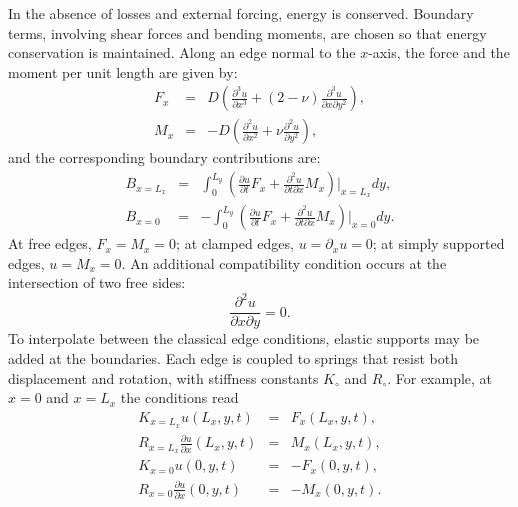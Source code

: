 %
In the absence of losses and external forcing, energy is conserved. Boundary terms, involving shear forces and bending moments, are chosen so that energy conservation is maintained. Along an edge normal to the $x$-axis, the force and the moment per unit length are given by:
\begin{subequations}
\begin{eqnarray}
F_x &=& D\!\left(\frac{\partial^3 u}{\partial x^3}+(2-\nu)\frac{\partial^3 u}{\partial x \partial y^2}\right), \\
M_x &=& -D\!\left(\frac{\partial^2 u}{\partial x^2}+\nu\frac{\partial^2 u}{\partial y^2}\right),
\end{eqnarray}
\end{subequations}
and the corresponding boundary contributions are:
\begin{subequations}
\begin{eqnarray}
B_{x=L_x} &=& \int_0^{L_y}\!\left(\frac{\partial u}{\partial t}F_x + \frac{\partial^2 u}{\partial t\partial x}M_x\right)\Big|_{x=L_x} dy, \\
B_{x=0} &=& -\int_0^{L_y}\!\left(\frac{\partial u}{\partial t}F_x + \frac{\partial^2 u}{\partial t\partial x}M_x\right)\Big|_{x=0} dy.
\end{eqnarray}
\end{subequations}
At free edges, $F_x=M_x=0$; at clamped edges, $u=\partial_x u=0$; at simply supported edges, $u=M_x=0$. An additional compatibility condition occurs at the intersection of two free sides:
\begin{equation}\label{eq:CornerCndCnt}
\frac{\partial^2 u}{\partial x \partial y} = 0.
\end{equation}
To interpolate between the classical edge conditions, elastic supports may be added at the boundaries. Each edge is coupled to springs that resist both displacement and rotation, with stiffness constants $K_\circ$ and $R_\circ$. For example, at $x=0$ and $x=L_x$ the conditions read
%
\begin{subequations}\label{eq:ElasticBCsCnt}
\begin{eqnarray}
K_{x=L_x} u(L_x,y,t) &=& F_x(L_x,y,t), \\ 
R_{x=L_x} \frac{\partial u}{\partial x}(L_x,y,t) &=& M_x(L_x,y,t), \\
K_{x=0} u(0,y,t) &=& -F_x(0,y,t), \\ 
R_{x=0} \frac{\partial u}{\partial x}(0,y,t) &=& -M_x(0,y,t).
\end{eqnarray}
\end{subequations}
